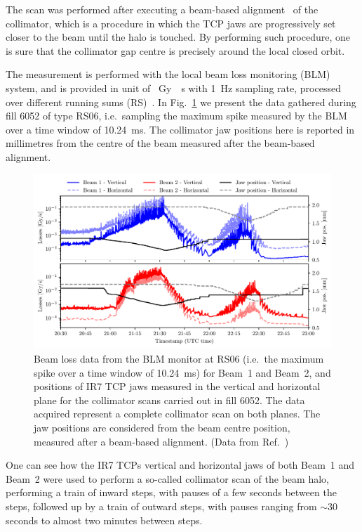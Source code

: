 The scan was performed after executing a beam-based alignment~\cite{valentino2012semiautomatic} of the collimator, which is a procedure in which the TCP jaws are progressively set closer to the beam until the halo is touched. By performing such procedure, one is sure that the collimator gap centre is precisely around the local closed orbit.

The measurement is performed with the local beam loss monitoring (BLM) system, and is provided in unit of \SI{}{Gy \per s} with \SI{1}{Hz} sampling rate, processed over different running sums (RS)~\cite{Bruning:782076}. In Fig.~\ref{fig:raw_data} we present the data gathered during fill 6052 of type RS06, i.e.\ sampling the maximum spike measured by the BLM over a time window of \SI{10.24}{ms}. The collimator jaw positions here is reported in millimetres from the centre of the beam measured after the beam-based alignment.

\begin{figure}[hpt]
    \centering
    \includegraphics[width=\textwidth]{5_Diffusion_measurement_LHC/figs/raw.pdf}
    \caption{Beam loss data from the BLM monitor at RS06 (i.e.\ the maximum spike over a time window of \SI{10.24}{ms}) for Beam~1 and Beam~2, and positions of IR7 TCP jaws measured in the vertical and horizontal plane for the collimator scans carried out in fill 6052. The data acquired represent a complete collimator scan on both planes. The jaw positions are considered from the beam centre position, measured after a beam-based alignment. (Data from Ref.~\cite{PhysRevAccelBeams.23.044802})}
    \label{fig:raw_data}
\end{figure}

One can see how the IR7 TCPs vertical and horizontal jaws of both Beam~1 and Beam~2 were used to perform a so-called collimator scan of the beam halo, performing a train of inward steps, with pauses of a few seconds between the steps, followed up by a train of outward steps, with pauses ranging from $\sim30$ seconds to almost two minutes between steps.

